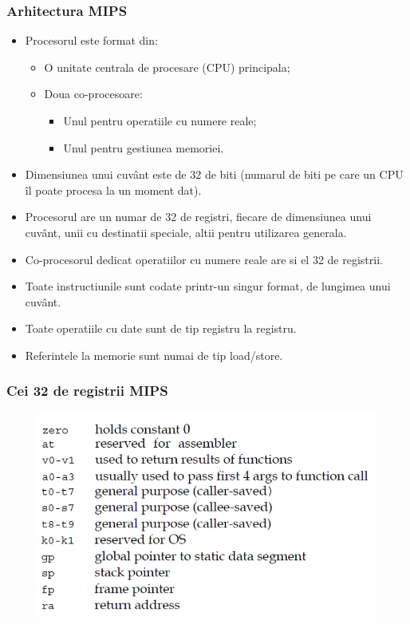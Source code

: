 \documentclass[pdf]{beamer}
\begin{document}
\begin{frame}
\frametitle{Arhitectura MIPS}
\begin{itemize}
\item
Procesorul este format din:
\begin{itemize}
\item
O unitate centrala de procesare (CPU) principala;
\item
Doua co-procesoare:
\begin{itemize}
\item
Unul pentru operatiile cu numere reale;
\item
Unul pentru gestiunea memoriei.
\end{itemize}
\end{itemize}
\item
Dimensiunea unui cuvânt este de 32 de biti (numarul de biti pe care un CPU îl poate procesa la un moment dat).
\item
Procesorul are un numar de 32 de registri, fiecare de dimensiunea unui cuvânt, unii cu destinatii speciale, altii pentru utilizarea generala.
\item
Co-procesorul dedicat operatiilor cu numere reale are si el 32 de registrii.
\item
Toate instructiunile sunt codate printr-un singur format, de lungimea unui cuvânt.
\item
Toate operatiile cu date sunt de tip registru la registru.
\item
Referintele la memorie sunt numai de tip load/store.
\end{itemize} 
\end{frame}



\begin{frame}
\frametitle{Cei 32 de registrii MIPS}
\begin{figure}
\includegraphics[width=\linewidth]{poza5.png} 
\end{figure}
\end{frame}
\end{document}
